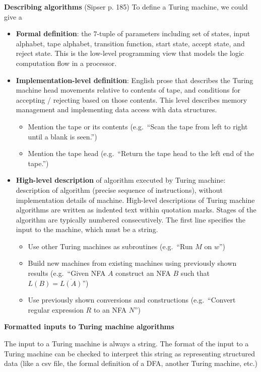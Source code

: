 \documentclass[12pt, oneside]{article}
\begin{document}
{\bf Describing  algorithms} (Sipser p. 185) To define a Turing machine, we could give a 
\begin{itemize}
\item {\bf Formal definition}: the $7$-tuple of parameters including set of states, 
input alphabet, tape alphabet, transition function, start state, accept state, and reject state.
This is the low-level programming view that models the logic computation flow in a processor.
\item {\bf Implementation-level definition}: English prose that describes the Turing machine head 
movements relative to contents of tape, and conditions for accepting / rejecting based on those contents.
This level describes memory management and implementing data access with data structures.
  \begin{itemize}
    \item Mention the tape or its contents (e.g.\ ``Scan the tape from left to right until a blank is seen.'')
    \item Mention the tape head (e.g.\ ``Return the tape head to the left end of the tape.'')
  \end{itemize}
\item {\bf High-level description} of algorithm executed by Turing machine: 
description of algorithm (precise sequence of instructions), 
without implementation details of machine. 
High-level descriptions of  Turing machine algorithms are written as indented text within quotation marks.   
Stages of the algorithm are typically numbered consecutively.
The first line specifies the input to the machine, which must be a string.
  \begin{itemize}
    \item Use other Turing machines as subroutines (e.g.\ ``Run $M$ on $w$'')
    \item Build new machines from existing machines using previously shown results (e.g.\ 
    ``Given NFA $A$ construct an NFA $B$ such that $L(B) = \overline{L(A)}$'')
    \item Use previously shown conversions and constructions (e.g.\ ``Convert regular expression $R$ 
    to an NFA $N$'')
  \end{itemize}
\end{itemize}

{\bf Formatted inputs to Turing machine algorithms}

The input to a Turing machine is always a string. 
The format of the input to a Turing machine can be checked to interpret 
this string as representing structured data (like a csv file, the formal definition of a DFA, another Turing machine, etc.)
\end{document}
